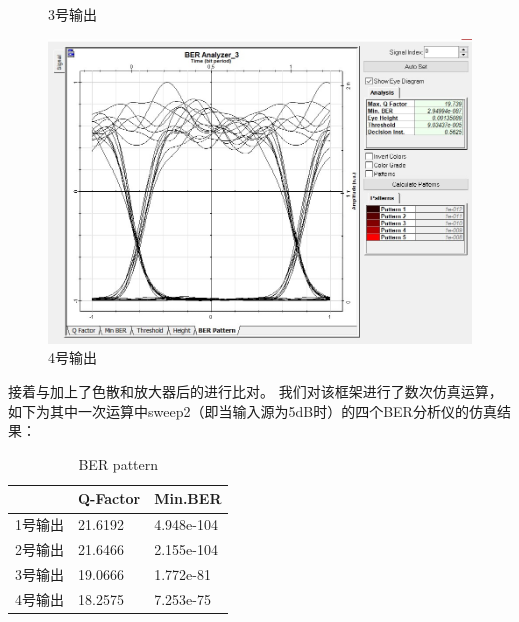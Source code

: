 \documentclass[12pt]{article}
\begin{document}
\begin{figure}[H]
\begin{minipage}[t]{0.5\linewidth}
      \caption{3号输出}
      \label{fig:side:a}
    \end{minipage}%
    \begin{minipage}[t]{0.5\linewidth}
      \centering
      \includegraphics[scale=0.5]{4-BER.jpg}
      \caption{4号输出}
      \label{fig:side:b}
    \end{minipage}
\end{figure}


接着与加上了色散和放大器后的进行比对。
我们对该框架进行了数次仿真运算，如下为其中一次运算中sweep2（即当输入源为5dB时）的四个BER分析仪的仿真结果：
\begin{table}[H]
  \centering
  \caption{BER pattern}
  \begin{tabular}{|l|l|l|} 
  \hline
    & Q-Factor & Min.BER    \\ 
  \hline
  1号输出 & 21.6192  & 4.948e-104  \\ 
  \hline
  2号输出 & 21.6466  & 2.155e-104  \\ 
  \hline
  3号输出 & 19.0666   & 1.772e-81  \\ 
  \hline
  4号输出 & 18.2575  & 7.253e-75  \\
  \hline
  \end{tabular}
  \end{table}
\end{document}
